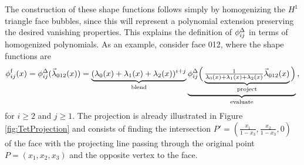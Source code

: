 The construction of these shape functions follows simply by homogenizing the $H^1$ triangle face bubbles, since this will represent a polynomial extension preserving the desired vanishing properties.
This explains the definition of $\phi_{ij}^\Delta$ in terms of homogenized polynomials.
As an example, consider face 012, where the shape functions are
\begin{equation*}
	\phi_{ij}^\mathrm{f}(x)=\phi_{ij}^\Delta(\vec{\lambda}_{012}(x))=
		\underbrace{(\lambda_0(x)+\lambda_1(x)+\lambda_2(x))^{i+j}}_{\text{blend}}\underbrace{\phi_{ij}^\Delta
			\Big(\underbrace{\textstyle{\frac{1}{\lambda_0(x)+\lambda_1(x)+\lambda_2(x)}}
				\vec{\lambda}_{012}(x)}_{\text{project}}\Big)}_{\text{evaluate}}\,,
\end{equation*}
for $i\geq2$ and $j\geq1$.
The projection is already illustrated in Figure \ref{fig:TetProjection} and consists of finding the intersection $P'=(\frac{x_1}{1-x_3},\frac{x_2}{1-x_3},0)$ of the face with the projecting line passing through the original point $P=(x_1,x_2,x_3)$ and the opposite vertex to the face. 


